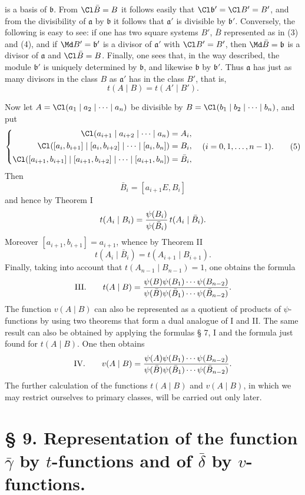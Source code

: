 is a basis of $\mathfrak b$. From $\Cl\bar B=B$ it follows easily that $\Cl\mathfrak b'=\Cl B'=B'$, and from the divisibility of $\mathfrak a$ by $\mathfrak b$ it follows that $\mathfrak a'$ is divisible by $\mathfrak b'$. Conversely, the following is easy to see: if one has two square systems $B'$, $\bar B$ represented as in (3) and (4), and if $\Md B'=\mathfrak b'$ is a divisor of $\mathfrak a'$ with $\Cl B'=B'$, then $\Md\bar B=\mathfrak b$ is a divisor of $\mathfrak a$ and $\Cl\bar B=B$. Finally, one sees that, in the way described, the module $\mathfrak b'$ is uniquely determined by $\mathfrak b$, and likewise $\mathfrak b$ by $\mathfrak b'$. Thus $\mathfrak a$ has just as many divisors in the class $B$ as $\mathfrak a'$ has in the class $B'$, that is,
\[
 t(A\mid B)=t(A'\mid B').
\]

Now let $A=\Cl(a_1\mid a_2\mid\cdots\mid a_n)$ be divisible by $B=\Cl(b_1\mid b_2\mid\cdots\mid b_n)$, and put
\begin{equation}
\left\{
\begin{aligned}
 \Cl(a_{i+1}\mid a_{i+2}\mid\cdots\mid a_n)&=A_i,\\
 \Cl([a_i,b_{i+1}]\mid[a_i,b_{i+2}]\mid\cdots\mid[a_i,b_n])&=B_i,\\
 \Cl([a_{i+1},b_{i+1}]\mid[a_{i+1},b_{i+2}]\mid\cdots\mid[a_{i+1},b_n])&=\bar B_i,
\end{aligned}
\right.
\quad (i=0,1,\ldots,n-1).
\tag{5}
\end{equation}
Then
\[
 \bar B_i=[a_{i+1}E,B_i]
\]
and hence by Theorem I
\[
 t(A_i\mid B_i)={\psi(B_i)\over\psi(\bar B_i)}\,t(A_i\mid\bar B_i).
\]
Moreover $[a_{i+1},b_{i+1}]=a_{i+1}$, whence by Theorem II
\[
 t(A_i\mid\bar B_i)=t(A_{i+1}\mid B_{i+1}).
\]
Finally, taking into account that $t(A_{n-1}\mid B_{n-1})=1$, one obtains the formula
\[
\text{III.}\qquad
 t(A\mid B)=
 {\psi(B)\psi(B_1)\cdots\psi(B_{n-2})
 \over
 \psi(\bar B)\psi(\bar B_1)\cdots\psi(\bar B_{n-2})}.
\]
The function $v(A\mid B)$ can also be represented as a quotient of products of $\psi$-functions by using two theorems that form a dual analogue of I and II. The same result can also be obtained by applying the formulas § 7, I and the formula just found for $t(A\mid B)$. One then obtains
\[
\text{IV.}\qquad
 v(A\mid B)=
 {\psi(A)\psi(B_1)\cdots\psi(B_{n-2})
 \over
 \psi(\bar B)\psi(\bar B_1)\cdots\psi(\bar B_{n-2})}.
\]
The further calculation of the functions $t(A\mid B)$ and $v(A\mid B)$, in which we may restrict ourselves to primary classes, will be carried out only later.

\section*{§ 9. Representation of the function $\bar\gamma$ by $t$-functions and of $\bar\delta$ by $v$-functions.}

